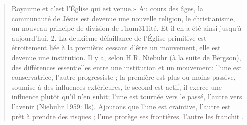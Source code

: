 \begin{quote}
Royaume et c'est l'Église qui est venue.» Au cours des âges, la
communauté de Jésus est devenue une nouvelle religion, le
christianisme, un nouveau principe de division de l'hum311ité. Et il en
a été ainsi jusqu'à aujourd'hui.
2. La deuxième défaillance de l'Église primitive est étroitement liée
à la première: cessant d'être un mouvement, elle est devenue une
institution. Il y a, selon H.R. Niebuhr (à la suite de Bergson), des
différences essentielles entre une institution et un mouvement: l'une
est conservatrice, l'autre progressiste ; la première est plus ou moins
passive, soumise à des influences extérieures, le second est actif, il
exerce une influence plutôt qu'il n'en subit; l'une est tournée vers le
passé, l'autre vers l'avenir (Niebuhr 1959: lls). Ajoutons que l'une
est craintive, l'autre est prêt à prendre des risques ; l'une protège ses
frontières. l'autre les franchit .
\end{quote}


